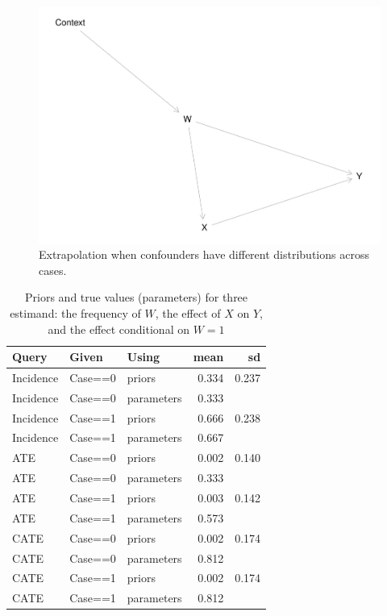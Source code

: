 \documentclass[
  12pt,
]{book}
\begin{document}
\begin{figure}
\centering
\includegraphics{ii_files/figure-latex/extval-1.pdf}
\caption{\label{fig:extval}Extrapolation when confounders have different distributions across cases.}
\end{figure}

\begin{table}

\caption{\label{tab:appev2}Priors and true values (parameters) for three estimand: the frequency of $W$, the effect of $X$ on $Y$, and the effect conditional on $W=1$}
\centering
\begin{tabular}[t]{l|l|l|r|r}
\hline
Query & Given & Using & mean & sd\\
\hline
Incidence & Case==0 & priors & 0.334 & 0.237\\
\hline
Incidence & Case==0 & parameters & 0.333 & \\
\hline
Incidence & Case==1 & priors & 0.666 & 0.238\\
\hline
Incidence & Case==1 & parameters & 0.667 & \\
\hline
ATE & Case==0 & priors & 0.002 & 0.140\\
\hline
ATE & Case==0 & parameters & 0.333 & \\
\hline
ATE & Case==1 & priors & 0.003 & 0.142\\
\hline
ATE & Case==1 & parameters & 0.573 & \\
\hline
CATE & Case==0 & priors & 0.002 & 0.174\\
\hline
CATE & Case==0 & parameters & 0.812 & \\
\hline
CATE & Case==1 & priors & 0.002 & 0.174\\
\hline
CATE & Case==1 & parameters & 0.812 & \\
\hline
\end{tabular}
\end{table}
\end{document}
